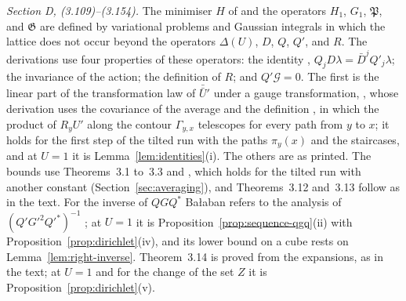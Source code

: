 \documentclass[11pt]{preprint}
\numberwithin{equation}{section}
\theoremstyle{definition}
\theoremstyle{remark}
\theoremstyle{plain}
\begin{document}
\emph{Section D, (3.109)--(3.154).} The minimiser $H$ of \cite[(3.109), (3.110)]{BalabanPBG} and the operators $H_1$, $G_1$, $\mathfrak P$, and $\mathfrak G$ are defined by variational problems and Gaussian integrals in which the lattice does not occur beyond the operators $\Delta(U)$, $D$, $Q$, $Q'$, and $R$. The derivations \cite[(3.112)--(3.130), (3.139)--(3.153)]{BalabanPBG} use four properties of these operators: the identity \cite[(3.114), (3.115)]{BalabanPBG}, $Q_jD\lambda = \bar D^jQ'_j\lambda$; the invariance \cite[(3.117)]{BalabanPBG} of the action; the definition of $R$; and $Q'\mathscr G = 0$. The first is the linear part of the transformation law of $\bar{\bar U}'$ under a gauge transformation, \cite[p.~418]{BalabanPBG}, whose derivation uses the covariance of the average and the definition \cite[(3.113)]{BalabanPBG}, in which the product of $R_yU'$ along the contour $\Gamma_{y,x}$ telescopes for every path from $y$ to $x$; it holds for the first step of the tilted run with the paths $\pi_y(x)$ and the staircases, and at $U = 1$ it is Lemma~\ref{lem:identities}(i). The others are as printed. The bounds \cite[(3.131)--(3.133), (3.137)]{BalabanPBG} use Theorems~3.1 to~3.3 and \cite[(149)]{BalabanAVG}, which holds for the tilted run with another constant (Section~\ref{sec:averaging}), and Theorems~3.12 and~3.13 follow as in the text. For the inverse of $QGQ^*$ Ba{\l}aban refers to the analysis of $(Q'G'^2Q'^*)^{-1}$ \cite[p.~422]{BalabanPBG}; at $U = 1$ it is Proposition~\ref{prop:sequence-qgq}(ii) with Proposition~\ref{prop:dirichlet}(iv), and its lower bound on a cube rests on Lemma~\ref{lem:right-inverse}. Theorem~3.14 is proved from the expansions, as in the text; at $U = 1$ and for the change of the set $Z$ it is Proposition~\ref{prop:dirichlet}(v).
\end{document}
